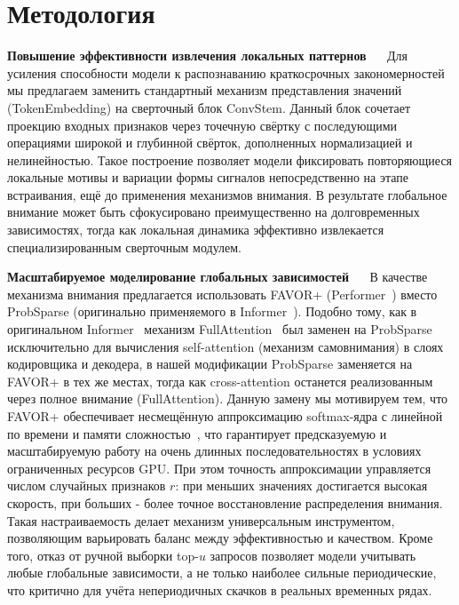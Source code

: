 \section{Методология}

\textbf{Повышение эффективности извлечения локальных паттернов} $\quad$
Для усиления способности модели к распознаванию краткосрочных закономерностей мы 
предлагаем заменить стандартный механизм представления значений (TokenEmbedding) 
на сверточный блок ConvStem. Данный блок сочетает проекцию входных признаков через 
точечную свёртку с последующими операциями широкой и глубинной свёрток, дополненных 
нормализацией и нелинейностью. Такое построение позволяет модели фиксировать повторяющиеся 
локальные мотивы и вариации формы сигналов непосредственно на этапе встраивания, 
ещё до применения механизмов внимания. В результате глобальное внимание может быть 
сфокусировано преимущественно на долговременных зависимостях, тогда как локальная 
динамика эффективно извлекается специализированным сверточным модулем.

\textbf{Масштабируемое моделирование глобальных зависимостей} $\quad$
В качестве механизма внимания предлагается использовать FAVOR+
(Performer~\cite{performer}) вместо ProbSparse (оригинально применяемого 
в Informer~\cite{informer}).
Подобно тому, как в оригинальном Informer~\cite{informer} 
механизм FullAttention~\cite{transformer} был
заменен на ProbSparse исключительно для вычисления self-attention (механизм самовнимания) в 
слоях кодировщика и декодера, в нашей модификации ProbSparse заменяется 
на FAVOR+ в тех же местах, тогда как cross-attention останется 
реализованным через полное внимание (FullAttention).
Данную замену мы мотивируем тем, что FAVOR+ обеспечивает  
несмещённую аппроксимацию softmax-ядра с линейной по времени
и памяти сложностью~\cite{performer}, что гарантирует предсказуемую и масштабируемую
работу на очень длинных последовательностях в условиях ограниченных
ресурсов GPU. 
При этом точность аппроксимации управляется числом случайных признаков $r$: 
при меньших значениях достигается высокая скорость, при больших - более 
точное восстановление распределения внимания. Такая настраиваемость делает механизм 
универсальным инструментом, позволяющим варьировать баланс между эффективностью и 
качеством.
Кроме того, отказ от ручной выборки top-$u$ запросов
позволяет модели учитывать любые глобальные зависимости, а не только
наиболее сильные периодические, что критично для учёта 
непериодичных скачков в реальных временных рядах.

